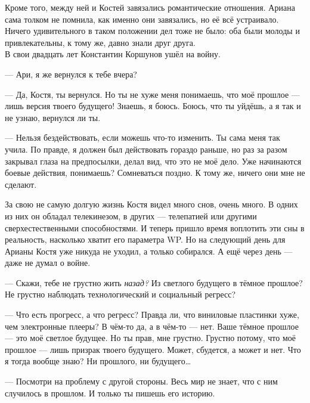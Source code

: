 \documentclass[openany, oneside]{book}
\begin{document}
Кроме того, между ней и Костей завязались романтические отношения. Ариана сама толком не помнила, как именно они завязались, но её всё устраивало. Ничего удивительного в таком положении дел тоже не было: оба были молоды и привлекательны, к тому же, давно знали друг друга. \\





В свои двадцать лет Константин Коршунов ушёл на войну.

--- Ари, я же вернулся к тебе вчера?

--- Да, Костя, ты вернулся. Но ты не хуже меня понимаешь, что моё прошлое --- лишь версия твоего будущего! Знаешь, я боюсь. Боюсь, что ты уйдёшь, а я так и не узнаю, вернулся ли ты.

--- Нельзя бездействовать, если можешь что-то изменить. Ты сама меня так учила. По правде, я должен был действовать гораздо раньше, но раз за разом закрывал глаза на предпосылки, делал вид, что это не моё дело. Уже начинаются боевые действия, понимаешь? Сомневаться поздно. К тому же, ничего они мне не сделают.

За свою не самую долгую жизнь Костя видел много снов, очень много. В одних из них он обладал телекинезом, в других --- телепатией или другими сверхестественными способностями. И теперь пришло время воплотить эти сны в реальность, насколько хватит его параметра WP. Но на следующий день для Арианы Костя уже никуда не уходил, а только собирался. А ещё через день --- даже не думал о войне.

--- Скажи, тебе не грустно жить \textit{назад?} Из светлого будущего в тёмное прошлое? Не грустно наблюдать технологический и социальный регресс?

--- Что есть прогресс, а что регресс? Правда ли, что виниловые пластинки хуже, чем электронные плееры? В чём-то да, а в чём-то --- нет. Ваше тёмное прошлое --- это моё светлое будущее. Но ты прав, мне грустно. Грустно потому, что моё прошлое --- лишь призрак твоего будущего. Может, сбудется, а может и нет. Что я тогда вообще знаю? Ни прошлого, ни будущего\dots

--- Посмотри на проблему с другой стороны. Весь мир не знает, что с ним случилось в прошлом. И только ты пишешь его историю.\\
\end{document}
